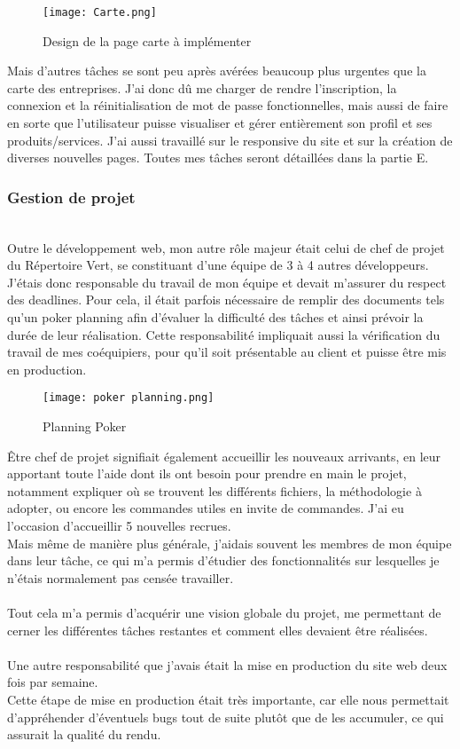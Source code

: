 \begin{figure}[H]
    \centering
    \texttt{[image: Carte.png]}
    \caption{Design de la page carte à implémenter}
\end{figure}


Mais d'autres tâches se sont peu après avérées beaucoup plus urgentes que la carte des entreprises. J'ai donc dû me charger de rendre l'inscription, la connexion et la réinitialisation de mot de passe fonctionnelles, 
mais aussi de faire en sorte que l'utilisateur puisse visualiser et gérer entièrement son profil et ses produits/services. J'ai aussi travaillé sur le responsive du site et sur la création de diverses nouvelles pages. Toutes mes tâches seront détaillées dans la partie E.

\subsubsection{Gestion de projet}
~\\
Outre le développement web, mon autre rôle majeur était celui de chef de projet du Répertoire Vert, se constituant d'une équipe de 3 à 4 autres développeurs.
J'étais donc responsable du travail de mon équipe et devait m'assurer du respect des deadlines. Pour cela, il était parfois nécessaire de remplir des documents tels qu'un poker planning afin d'évaluer la difficulté des tâches et ainsi prévoir la durée de leur réalisation.
Cette responsabilité impliquait aussi la vérification du travail de mes coéquipiers, pour qu'il soit présentable au client et puisse être mis en production.
\begin{figure}[H]
    \centering
    \texttt{[image: poker planning.png]}
    \caption{Planning Poker}
\end{figure}

Être chef de projet signifiait également accueillir les nouveaux arrivants, en leur apportant toute l'aide dont ils ont besoin pour prendre en main le projet, notamment expliquer où se trouvent les différents fichiers, la méthodologie à adopter, ou encore les commandes utiles en invite de commandes. J'ai eu l'occasion d'accueillir 5 nouvelles recrues.
\\Mais même de manière plus générale, j'aidais souvent les membres de mon équipe dans leur tâche, ce qui m'a permis d'étudier des fonctionnalités sur lesquelles je n'étais normalement pas censée travailler.
\\\\
Tout cela m'a permis d'acquérir une vision globale du projet, me permettant de cerner les différentes tâches restantes et comment elles devaient être réalisées.
\\\\
Une autre responsabilité que j'avais était la mise en production du site web deux fois par semaine. 
\\Cette étape de mise en production était très importante, car elle nous permettait d'appréhender d'éventuels bugs tout de suite plutôt que de les accumuler, ce qui assurait la qualité du rendu.


